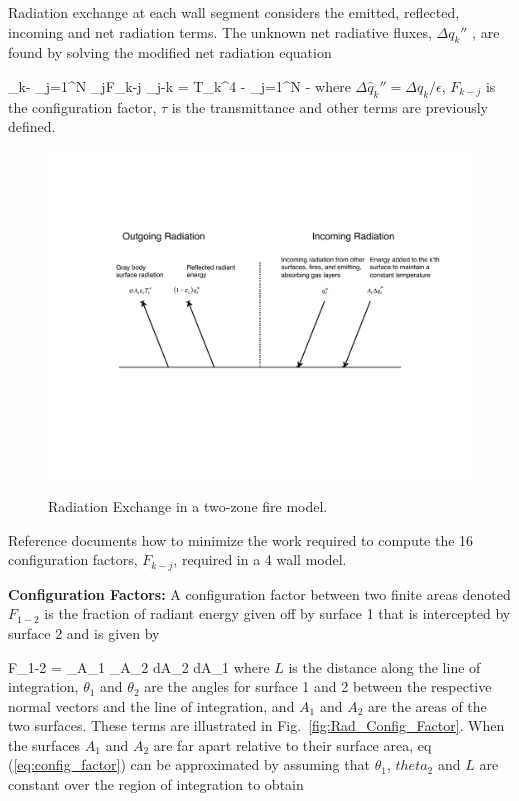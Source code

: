 Radiation exchange at each wall segment considers the emitted, reflected, incoming and net radiation terms.  The unknown net radiative fluxes, $\Delta q_k\dprime$ , are found by solving the modified net radiation equation

\be \Delta {}_k\dprime - \displaystyle\sum_{j=1}^N  \Delta {}_j\dprime F_{k-j} \tau_{j-k} = \sigma T_k^4 - \displaystyle\sum_{j=1}^N  -  \ee
where $\Delta \hat{q}_k\dprime = \Delta q_k / \epsilon$, $F_{k-j}$ is the configuration factor, $\tau$ is the transmittance and other terms are previously defined.
\begin{figure}
\begin{center}
\includegraphics[width=5.0in]{FIGURES/Theory/Radiation_Exchange}\\
\end{center}
\caption{Radiation Exchange in a two-zone fire model.}
 \label{fig:Rad_Exchange}
\end{figure}
Reference \cite{Forney_radiation} documents how to minimize the work required to compute the 16 configuration factors, $F_{k-j}$, required in a 4 wall model.


{\bf Configuration Factors:}  A configuration factor between two finite areas denoted $F_{1-2}$ is the fraction of radiant energy given off by surface 1 that is intercepted by  surface 2 and is given by

\be F_{1-2} =  \int_{A_1} \int_{A_2}  dA_2 dA_1 \label{eq:config_factor} \ee
where $L$ is the distance along the line of integration,  $\theta_1$ and $\theta_2$ are the angles for surface 1 and 2 between the respective normal vectors and the line of integration, and $A_1$ and $A_2$ are the areas of the two surfaces.  These terms are illustrated in Fig.~\ref{fig:Rad_Config_Factor}.  When the surfaces $A_1$ and $A_2$ are far apart relative to their surface area, eq (\ref{eq:config_factor}) can be approximated by assuming that $\theta_1$, $theta_2$ and $L$ are constant over the region of integration to obtain

